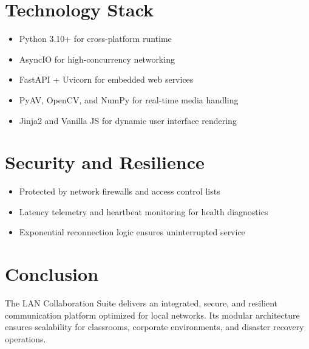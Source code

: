 \documentclass[conference]{IEEEtran}
\begin{document}
\section{Technology Stack}
\begin{itemize}
\item Python 3.10+ for cross-platform runtime
\item AsyncIO for high-concurrency networking
\item FastAPI + Uvicorn for embedded web services
\item PyAV, OpenCV, and NumPy for real-time media handling
\item Jinja2 and Vanilla JS for dynamic user interface rendering
\end{itemize}

\section{Security and Resilience}
\begin{itemize}
\item Protected by network firewalls and access control lists
\item Latency telemetry and heartbeat monitoring for health diagnostics
\item Exponential reconnection logic ensures uninterrupted service
\end{itemize}

\section{Conclusion}
The LAN Collaboration Suite delivers an integrated, secure, and resilient communication platform optimized for local networks. Its modular architecture ensures scalability for classrooms, corporate environments, and disaster recovery operations.



\end{document}
